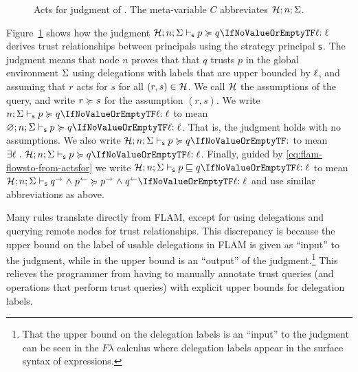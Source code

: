 \begin{figure}
    \caption{Acts for judgment of \lang. The meta-variable $C$ abbreviates $\mathcal{H}; n; \Sigma$.}
    \label{fig:act-for-judgment}
\end{figure}

Figure~\ref{fig:act-for-judgment} shows how the judgment $\actsforquery{\Assumps; n; \env}[\stratelem]{p}{q}{\level}$ derives trust relationships between principals using the strategy principal $\stratelem$. The judgment means that node $n$ proves that that $q$ trusts $p$ in the global environment $\Sigma$ using delegations with labels that are upper bounded by $\ell$, and assuming that $r$ acts for $s$ for all $(r, s) \in \mathcal{H}$. We call $\mathcal{H}$ the assumptions of the query, and write $r \succcurlyeq s$ for the assumption $(r, s)$. We write $\actsforquery{n; \env}[\stratelem]{p}{q}{\level}$ to mean $\actsforquery{\varnothing; n; \env}[\stratelem]{p}{q}{\level}$. That is, the judgment holds with no assumptions. We also write $\actsforquery{\Assumps; n; \env}[\stratelem]{p}{q}{}$ to mean $\exists \level~.~\actsforquery{\Assumps; n; \env}[\stratelem]{p}{q}{\level}$. Finally, guided by \eqref{eq:flam-flowsto-from-actsfor} we write $\flowstoquery{\Assumps; n; \env}[\stratelem]{p}{q}{\level}$ to mean $\actsforquery{\Assumps; n; \env}[\stratelem]{\conf{q} \conj \integ{p}}{\conf{p} \conj \integ{q}}{\level}$ and use similar abbreviations as above.

Many rules translate directly from FLAM, except for using delegations and querying remote nodes for trust relationships. This discrepancy is because the upper bound on the label of usable delegations in FLAM is given as ``input'' to the judgment, while in \lang{} the upper bound is an ``output'' of the judgment.\footnote{That the upper bound on the delegation labels is an ``input'' to the judgment can be seen in the $F\lambda$ calculus \cite{flamtr} where delegation labels appear in the surface syntax of expressions.} This relieves the programmer from having to  
manually annotate trust queries (and operations that perform trust queries) with explicit upper bounds for delegation labels.

